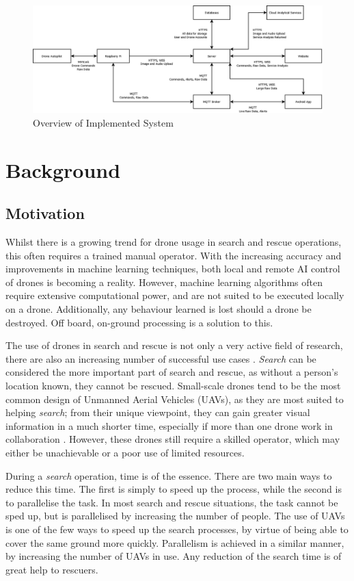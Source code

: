 \documentclass{article}
\begin{document}
\begin{landscape}
\begin{figure}[p]
\centering
\caption{Overview of Implemented System\label{fig:System}}
\includegraphics[width=1.5\textwidth]{System}
\end{figure}
\end{landscape}

\section{Background}
\subsection{Motivation}
Whilst there is a growing trend for drone usage in search and rescue operations, this often requires a trained manual operator. With the increasing accuracy and improvements in machine learning techniques, both local and remote AI control of drones is becoming a reality. However, machine learning algorithms often require extensive computational power, and are not suited to be executed locally on a drone. Additionally, any behaviour learned is lost should a drone be destroyed. Off board, on-ground processing is a solution to this. 

The use of drones in search and rescue is not only a very active field of research, there are also an increasing number of successful use cases \cite{UAVUseCase}. \emph{Search} can be considered the more important part of search and rescue, as without a person's location known, they cannot be rescued. Small-scale drones tend to be the most common design of Unmanned Aerial Vehicles (UAVs), as they are most suited to helping \emph{search}; from their unique viewpoint, they can gain greater visual information in a much shorter time, especially if more than one drone work in collaboration \cite{UAV}. However, these drones still require a skilled operator, which may either be unachievable or a poor use of limited resources.

During a \emph{search} operation, time is of the essence. There are two main ways to reduce this time. The first is simply to speed up the process, while the second is to parallelise the task. In most search and rescue situations, the task cannot be sped up, but is parallelised by increasing the number of people. The use of UAVs is one of the few ways to speed up the search processes, by virtue of being able to cover the same ground more quickly. Parallelism is achieved in a similar manner, by increasing the number of UAVs in use. Any reduction of the search time is of great help to rescuers. 
\end{document}
